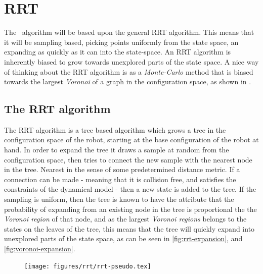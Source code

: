 \chapter{RRT}

The \rrtfunnel\ algorithm will be based upon the general \ac{RRT}
algorithm\cite[LaValle]{article}. This means that it will be sampling based,
picking points uniformly from the state space, an expanding as quickly as it can
into the state-space. An \ac{RRT} algorithm is inherently biased to grow towards
unexplored parts of the state space. A nice way of thinking about the \ac{RRT}
algorithm is as a \textit{Monte-Carlo} method that is biased towards the largest
\textit{Voronoi} of a graph in the configuration space, as shown
in \label{subsec:voronoi regions}. 

\section{The RRT algorithm}

The \ac{RRT} algorithm is a tree based algorithm which grows a tree in the
configuration space of the robot, starting at the base configuration of the
robot at hand. In order to expand the tree it draws a sample at random from the
configuration space, then tries to connect the new sample with the nearest node
in the tree. Nearest in the sense of some predetermined distance metric. If a
connection can be made - meaning that it is collision free, and satisfies the
constraints of the dynamical model - then a new state is added to the tree. If
the sampling is uniform, then the tree is known to have the attribute that the
probability of expanding from an existing node in the tree is proportional the
the \textit{Voronoi region} of that node, and as the largest \textit{Voronoi
  regions} belongs to the states on the leaves of the tree, this means that the
tree will quickly expand into unexplored parts of the state space, as can be
seen in \ref{fig:rrt-expansion}, and \ref{fig:voronoi-expansion}.

\begin{figure}
  \texttt{[image: figures/rrt/rrt-pseudo.tex]} %
\end{figure}

